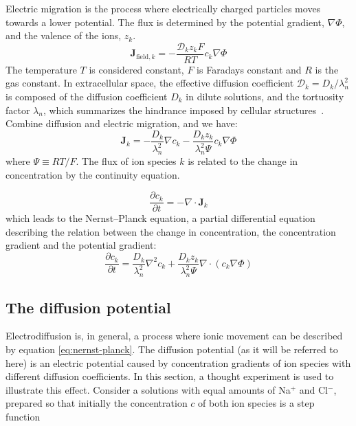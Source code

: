 \documentclass{article}
\begin{document}
Electric migration is the process where electrically charged particles moves towards a lower potential. The flux is determined by the potential gradient, $\nabla \Phi$,  and the valence of the ions, $z_k$. 
\begin{equation}\label{eq:field}
\bm{J}_{\text{field},k} = -\frac{\mathcal{D}_kz_kF}{RT} c_k\nabla \Phi
\end{equation}
The temperature $T$ is considered constant, $F$ is Faradays constant and $R$ is the gas constant. In extracellular space, the effective diffusion coefficient $\mathcal{D}_k ={D}_k/\lambda_n^2$ is composed of the diffusion coefficient $D_k$ in dilute solutions, and the tortuosity factor $\lambda_n$, which summarizes the hindrance imposed by cellular structures~\cite{Halnes2015}. Combine diffusion and electric migration, and we have:
 \begin{equation}\label{eq:eldiff flux}
\bm{J}_k = -\frac{D_k}{\lambda_n^2}\nabla c_k -\frac{D_k z_k}{\lambda_n^2 \Psi}c_k  \nabla \Phi
\end{equation}
where $\Psi \equiv RT/F$.
The flux of ion species $k$ is related to the change in concentration by the continuity equation. 

\begin{equation}\label{eq:continuity}
\frac{\partial c_k}{\partial t} = -\nabla\cdot \bm{J}_k
\end{equation}
which leads to the Nernst--Planck equation, a partial differential equation describing the relation between the change in concentration, the concentration gradient and the potential gradient:
 \begin{equation}\label{eq:nernst-planck}
\frac{\partial c_k}{\partial t}  = \frac{D_k}{\lambda_n^2}\nabla^2 c_k +\frac{D_k z_k}{\lambda_n^2 \Psi}\nabla \cdot (c_k  \nabla \Phi)
\end{equation}


\subsection{The diffusion potential}
Electrodiffusion is, in general, a process where ionic movement can be described by equation \ref{eq:nernst-planck}. The diffusion potential (as it will be referred to here) is an electric potential caused by concentration gradients of ion species with different diffusion coefficients. In this section, a thought experiment is used to illustrate this effect.
Consider a solutions with equal amounts of Na$^+$ and Cl$^-$, prepared so that initially the concentration $c$ of both ion species is a step function 
\end{document}
